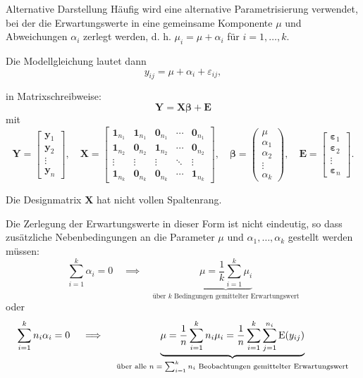 \begin{defi}{Alternative Darstellung}
    Häufig wird eine alternative Parametrisierung verwendet, bei der die Erwartungswerte in eine gemeinsame Komponente $\mu$ und Abweichungen $\alpha_i$ zerlegt werden, d. h. $\mu_i = \mu + \alpha_i$ für $i = 1, \ldots, k$.

    Die Modellgleichung lautet dann
    \[
        y_{ij} = \mu + \alpha_i + \varepsilon_{ij},
    \]

    in Matrixschreibweise:
    \[
        \mathbf{Y} = \mathbf{X} \boldsymbol{\beta} + \mathbf{E}
    \]
    mit
    \[
        \mathbf{Y} = \begin{bmatrix}
            \mathbf{y}_1 \\ \mathbf{y}_2 \\ \vdots \\ \mathbf{y}_n
        \end{bmatrix},
        \quad \mathbf{X} = \begin{bmatrix}
            \mathbf{1}_{n_1} & \mathbf{1}_{n_1} & \mathbf{0}_{n_1} & \cdots & \mathbf{0}_{n_1} \\
            \mathbf{1}_{n_2} & \mathbf{0}_{n_2} & \mathbf{1}_{n_2} & \cdots & \mathbf{0}_{n_2} \\
            \vdots           & \vdots           & \vdots           & \ddots & \vdots           \\
            \mathbf{1}_{n_k} & \mathbf{0}_{n_k} & \mathbf{0}_{n_k} & \cdots & \mathbf{1}_{n_k}
        \end{bmatrix},
        \quad \boldsymbol{\beta} = \begin{pmatrix}
            \mu \\ \alpha_1 \\ \alpha_2 \\ \vdots \\ \alpha_k
        \end{pmatrix},
        \quad \mathbf{E} = \begin{bmatrix}
            \boldsymbol{\varepsilon}_1 \\ \boldsymbol{\varepsilon}_2 \\ \vdots \\ \boldsymbol{\varepsilon}_n
        \end{bmatrix}.
    \]

    Die Designmatrix $\mathbf{X}$ hat nicht vollen Spaltenrang.

    Die Zerlegung der Erwartungswerte in dieser Form ist nicht eindeutig, so dass zusätzliche Nebenbedingungen an die Parameter $\mu$ und $\alpha_1, \ldots, \alpha_k$ gestellt werden müssen:
    \[
        \sum_{i=1}^{k} \alpha_i = 0 \quad \implies \quad \underbrace{\mu = \frac{1}{k} \sum_{i=1}^{k} \mu_i}_{\text{über $k$ Bedingungen gemittelter Erwartungswert}}
    \]
    oder
    \[
        \sum_{i=1}^{k} n_i \alpha_i = 0 \quad \implies \quad \underbrace{\mu = \frac{1}{n} \sum_{i=1}^{k} n_i \mu_i = \frac{1}{n} \sum_{i=1}^{k} \sum_{j=1}^{n_i} \operatorname{E} (y_{ij})}_{\text{über alle $n = \sum_{i=1}^{k} n_i$ Beobachtungen gemittelter Erwartungswert}}
    \]


\end{defi}
